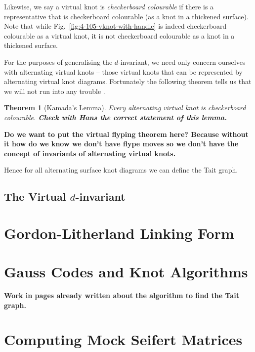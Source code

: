 \documentclass[12pt]{report}
\newcommand{\notered}[1]{{\color{Red} \textbf{#1}}}
\newtheorem*{theorem}{Theorem}
\begin{document}
Likewise, we say a virtual knot is \textit{checkerboard colourable} if there is a representative that is checkerboard colourable (as a knot in a thickened surface). Note that while Fig.~\ref{fig:4-105-vknot-with-handle} is indeed checkerboard colourable as a virtual knot, it is not checkerboard colourable as a knot in a thickened surface.

For the purposes of generalising the $d$-invariant, we need only concern ourselves with alternating virtual knots -- those virtual knots that can be represented by alternating virtual knot diagrams. Fortunately the following theorem tells us that we will not run into any trouble \cite{jones-polynomial-checkerboard-colourable}.

\begin{theorem}[Kamada's Lemma]
	Every alternating virtual knot is checkerboard colourable. \notered{Check with Hans the correct statement of this lemma.}
\end{theorem}

\notered{Do we want to put the virtual flyping theorem here? Because without it how do we know we don't have flype moves so we don't have the concept of invariants of alternating virtual knots.}

Hence for all alternating surface knot diagrams we can define the Tait graph. 

\section{The Virtual $d$-invariant}

\chapter{Gordon-Litherland Linking Form}

\chapter{Gauss Codes and Knot Algorithms}
\notered{Work in pages already written about the algorithm to find the Tait graph.}


\chapter{Computing Mock Seifert Matrices}
\end{document}
